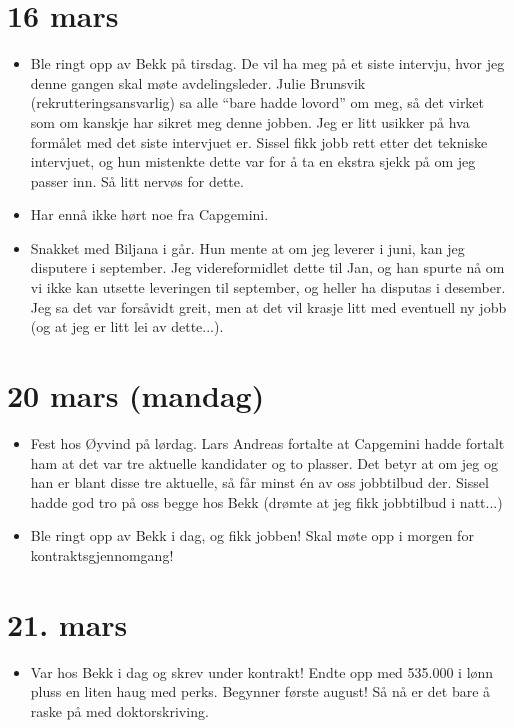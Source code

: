 \documentclass[11pt, norsk]{article}
\begin{document}

\section{16 mars} %
\label{sec:16_mars}

\begin{itemize}
  \item Ble ringt opp av Bekk på tirsdag. De vil ha meg på et siste intervju, hvor jeg denne gangen skal møte avdelingsleder. Julie Brunsvik (rekrutteringsansvarlig) sa alle ``bare hadde lovord'' om meg, så det virket som om kanskje har sikret meg denne jobben. Jeg er litt usikker på hva formålet med det siste intervjuet er. Sissel fikk jobb rett etter det tekniske intervjuet, og hun mistenkte dette var for å ta en ekstra sjekk på om jeg passer inn. Så litt nervøs for dette.
  \item Har ennå ikke hørt noe fra Capgemini.
  \item Snakket med Biljana i går. Hun mente at om jeg leverer i juni, kan jeg disputere i september. Jeg videreformidlet dette til Jan, og han spurte nå om vi ikke kan utsette leveringen til september, og heller ha disputas i desember. Jeg sa det var forsåvidt greit, men at det vil krasje litt med eventuell ny jobb (og at jeg er litt lei av dette...).
\end{itemize}


\section{20 mars (mandag)} %
\label{sec:20_mars}

\begin{itemize}
  \item Fest hos Øyvind på lørdag. Lars Andreas fortalte at Capgemini hadde fortalt ham at det var tre aktuelle kandidater og to plasser. Det betyr at om jeg og han er blant disse tre aktuelle, så får minst én av oss jobbtilbud der. Sissel hadde god tro på oss begge hos Bekk (drømte at jeg fikk jobbtilbud i natt...)
  \item Ble ringt opp av Bekk i dag, og fikk jobben! Skal møte opp i morgen for kontraktsgjennomgang! 
\end{itemize}

\section{21. mars} %
\label{sec:21_mars}

\begin{itemize}
  \item Var hos Bekk i dag og skrev under kontrakt! Endte opp med 535.000 i lønn pluss en liten haug med perks. Begynner første august! Så nå er det bare å raske på med doktorskriving.
\end{itemize}

\end{document}

